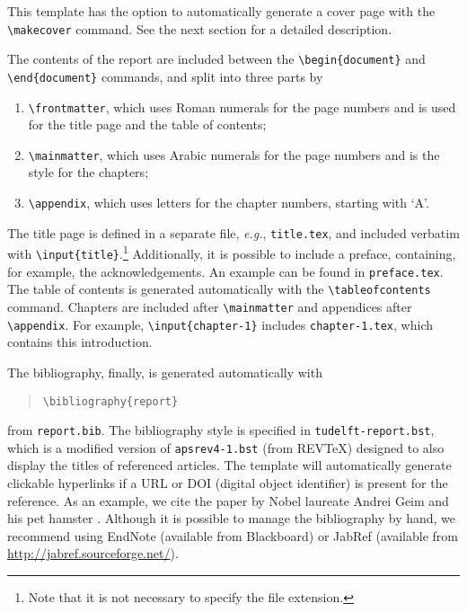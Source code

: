 This template has the option to automatically generate a cover page with the \texttt{\textbackslash makecover} command. See the next section for a detailed description.

The contents of the report are included between the \texttt{\textbackslash begin\{document\}} and \texttt{\textbackslash end\{document\}} commands, and split into three parts by
\begin{enumerate}
\item\texttt{\textbackslash frontmatter}, which uses Roman numerals for the page numbers and is used for the title page and the table of contents;
\item\texttt{\textbackslash mainmatter}, which uses Arabic numerals for the page numbers and is the style for the chapters;
\item\texttt{\textbackslash appendix}, which uses letters for the chapter numbers, starting with `A'.
\end{enumerate}
The title page is defined in a separate file, \emph{e.g.}, \texttt{title.tex}, and included verbatim with \texttt{\textbackslash input\{title\}}.\footnote{Note that it is not necessary to specify the file extension.} Additionally, it is possible to include a preface, containing, for example, the acknowledgements. An example can be found in \texttt{preface.tex}. The table of contents is generated automatically with the \texttt{\textbackslash tableofcontents} command. Chapters are included after \texttt{\textbackslash mainmatter} and appendices after \texttt{\textbackslash appendix}. For example, \texttt{\textbackslash input\{chapter-1\}} includes \texttt{chapter-1.tex}, which contains this introduction.

The bibliography, finally, is generated automatically with
\begin{quote}
    \texttt{\textbackslash bibliography\{report\}}
\end{quote}
from \texttt{report.bib}. The bibliography style is specified in \texttt{tudelft-report.bst}, which is a modified version of \texttt{apsrev4-1.bst} (from REVTeX) designed to also display the titles of referenced articles. The template will automatically generate clickable hyperlinks if a URL or DOI (digital object identifier) is present for the reference. As an example, we cite the paper by Nobel laureate Andrei Geim and his pet hamster \citep{Geim2001}. Although it is possible to manage the bibliography by hand, we recommend using EndNote (available from Blackboard) or JabRef (available from \url{http://jabref.sourceforge.net/}).

